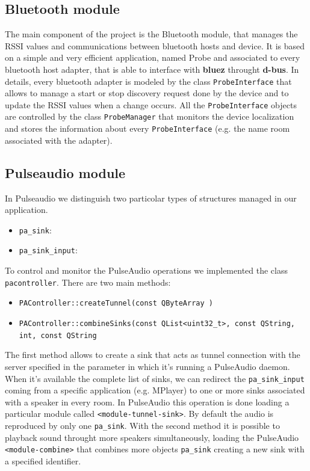 \documentclass[conference]{./IEEEtran}
\begin{document}
\subsection{Bluetooth module}
The main component of the project is the Bluetooth module, that manages the RSSI values and communications between bluetooth hosts and device. It is based on a simple and very efficient application, named Probe and associated to every bluetooth host adapter, that is able to interface with \textbf{bluez} throught \textbf{d-bus}. In details, every bluetooth adapter is modeled by the class \texttt{ProbeInterface} that allows to manage a start or stop discovery request done by the device and to update the RSSI values when a change occurs. All the \texttt{ProbeInterface} objects are controlled by the class \texttt{ProbeManager} that monitors the device localization and stores the information about every \texttt{ProbeInterface} (e.g. the name room associated with the adapter).     

\subsection{Pulseaudio module}
In Pulseaudio we distinguish two particolar types of structures managed in our application.
\begin{itemize}
\item \texttt{pa\_sink}: 
\item \texttt{pa\_sink\_input}:
\end{itemize}
To control and monitor the PulseAudio operations we implemented the class \texttt{pacontroller}. There are two main methods:
\begin{itemize}
\item \texttt{PAController::createTunnel(const QByteArray )}
\item \texttt{PAController::combineSinks(const QList<uint32\_t>, const QString, int, const QString}
\end{itemize} 
The first method allows to create a sink that acts as tunnel connection with the server specified in the parameter in which it's running a PulseAudio daemon. When it's available the complete list of sinks, we can redirect the \texttt{pa\_sink\_input} coming from a specific application (e.g. MPlayer) to one or more sinks associated with a speaker in every room. In PulseAudio this operation is done loading a particular module called \texttt{<module-tunnel-sink>}. 
By default the audio is reproduced by only one \texttt{pa\_sink}. With the second method it is possible to playback sound throught more speakers simultaneously, loading the PulseAudio \texttt{<module-combine>} that combines more objects \texttt{pa\_sink} creating a new sink with a specified identifier.  
\end{document}
